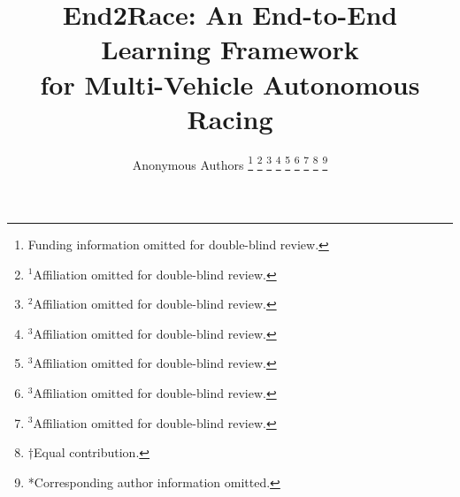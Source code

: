 \documentclass[letterpaper,10 pt,conference]{ieeeconf}
\begin{document}

\title{\LARGE \bf End2Race: An End-to-End Learning Framework \\ for Multi-Vehicle Autonomous Racing}



\author{Anonymous Authors
\thanks{Funding information omitted for double-blind review.}%
\thanks{$^{1}$Affiliation omitted for double-blind review.} 
\thanks{$^{2}$Affiliation omitted for double-blind review.}
\thanks{$^{3}$Affiliation omitted for double-blind review.}
\thanks{$^{3}$Affiliation omitted for double-blind review.}
\thanks{$^{3}$Affiliation omitted for double-blind review.}
\thanks{$^{3}$Affiliation omitted for double-blind review.}
\thanks{†Equal contribution.}%
\thanks{*Corresponding author information omitted.}%
}

\end{document}
